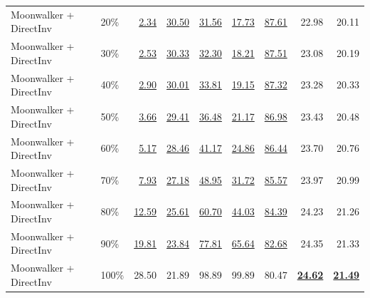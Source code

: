 \documentclass[10pt]{article}
\begin{document}
\begin{table}[htbp]
{\begin{tabular}{llrrrrrrr}
Moonwalker + DirectInv & 20\% & \underline{2.34} & \underline{30.50} & \underline{31.56} & \underline{17.73} & \underline{87.61} & 22.98 & 20.11 \\
Moonwalker + DirectInv & 30\% & \underline{2.53} & \underline{30.33} & \underline{32.30} & \underline{18.21} & \underline{87.51} & 23.08 & 20.19 \\
Moonwalker + DirectInv & 40\% & \underline{2.90} & \underline{30.01} & \underline{33.81} & \underline{19.15} & \underline{87.32} & 23.28 & 20.33 \\
Moonwalker + DirectInv & 50\% & \underline{3.66} & \underline{29.41} & \underline{36.48} & \underline{21.17} & \underline{86.98} & 23.43 & 20.48 \\
Moonwalker + DirectInv & 60\% & \underline{5.17} & \underline{28.46} & \underline{41.17} & \underline{24.86} & \underline{86.44} & 23.70 & 20.76 \\
Moonwalker + DirectInv & 70\% & \underline{7.93} & \underline{27.18} & \underline{48.95} & \underline{31.72} & \underline{85.57} & 23.97 & 20.99 \\
Moonwalker + DirectInv & 80\% & \underline{12.59} & \underline{25.61} & \underline{60.70} & \underline{44.03} & \underline{84.39} & 24.23 & 21.26 \\
Moonwalker + DirectInv & 90\% & \underline{19.81} & \underline{23.84} & \underline{77.81} & \underline{65.64} & \underline{82.68} & 24.35 & 21.33 \\
Moonwalker + DirectInv & 100\% & 28.50 & 21.89 & 98.89 & 99.89 & 80.47 & \underline{\textbf{24.62}} & \underline{\textbf{21.49}} \\
\bottomrule
\end{tabular}}
\end{table}
\clearpage
\end{document}
